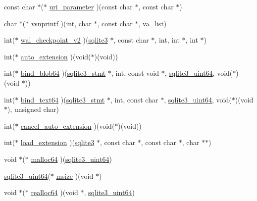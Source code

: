 \begin{DoxyCompactItemize}
const char $\ast$($\ast$ \hyperlink{structsqlite3__api__routines_add5f520297676876e836eec5c976c6ba}{uri\+\_\+parameter} )(const char $\ast$, const char $\ast$)
\item 
char $\ast$($\ast$ \hyperlink{structsqlite3__api__routines_aa6b21fe467cc3eabacec66d2d1f9bf4f}{vsnprintf} )(int, char $\ast$, const char $\ast$, va\+\_\+list)
\item 
int($\ast$ \hyperlink{structsqlite3__api__routines_a86ce375053098d8fbb2d686e9d98d12e}{wal\+\_\+checkpoint\+\_\+v2} )(\hyperlink{sqlite3_8h_a0ef6f2646262c8a9b24368d8ac140f69}{sqlite3} $\ast$, const char $\ast$, int, int $\ast$, int $\ast$)
\item 
int($\ast$ \hyperlink{structsqlite3__api__routines_a19d7b88cb46d7c9984c681eaf3ebf1a6}{auto\+\_\+extension} )(void($\ast$)(void))
\item 
int($\ast$ \hyperlink{structsqlite3__api__routines_aa34e69966762f91f4570cee3cb8f630f}{bind\+\_\+blob64} )(\hyperlink{sqlite3_8h_af2a033da1327cdd77f0a174a09aedd0c}{sqlite3\+\_\+stmt} $\ast$, int, const void $\ast$, \hyperlink{sqlite3_8h_a181c20ecfd72bc6627635746d382c610}{sqlite3\+\_\+uint64}, void($\ast$)(void $\ast$))
\item 
int($\ast$ \hyperlink{structsqlite3__api__routines_aab0cca7b94c71fa0e335cdbb17820ab5}{bind\+\_\+text64} )(\hyperlink{sqlite3_8h_af2a033da1327cdd77f0a174a09aedd0c}{sqlite3\+\_\+stmt} $\ast$, int, const char $\ast$, \hyperlink{sqlite3_8h_a181c20ecfd72bc6627635746d382c610}{sqlite3\+\_\+uint64}, void($\ast$)(void $\ast$), unsigned char)
\item 
int($\ast$ \hyperlink{structsqlite3__api__routines_ad2af85260429714c4bde212f2d0f0516}{cancel\+\_\+auto\+\_\+extension} )(void($\ast$)(void))
\item 
int($\ast$ \hyperlink{structsqlite3__api__routines_a33eef15b418c498b26cd052daf668f01}{load\+\_\+extension} )(\hyperlink{sqlite3_8h_a0ef6f2646262c8a9b24368d8ac140f69}{sqlite3} $\ast$, const char $\ast$, const char $\ast$, char $\ast$$\ast$)
\item 
void $\ast$($\ast$ \hyperlink{structsqlite3__api__routines_a2c977ab4d411d120321302b42e3c3139}{malloc64} )(\hyperlink{sqlite3_8h_a181c20ecfd72bc6627635746d382c610}{sqlite3\+\_\+uint64})
\item 
\hyperlink{sqlite3_8h_a181c20ecfd72bc6627635746d382c610}{sqlite3\+\_\+uint64}($\ast$ \hyperlink{structsqlite3__api__routines_a9cee16233cf2f31c23dbda654b1fdfc1}{msize} )(void $\ast$)
\item 
void $\ast$($\ast$ \hyperlink{structsqlite3__api__routines_ac840cfa13e7761011e5fbd0a7dce7a12}{realloc64} )(void $\ast$, \hyperlink{sqlite3_8h_a181c20ecfd72bc6627635746d382c610}{sqlite3\+\_\+uint64})
$$
\end{DoxyCompactItemize}
